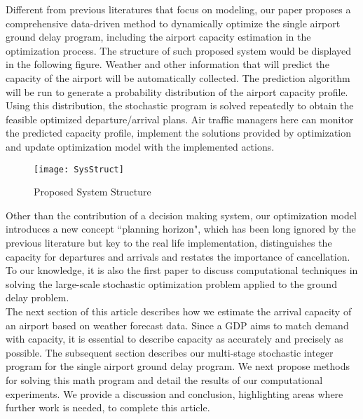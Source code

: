 \documentclass[12pt]{article}
\begin{document}
	\newline
	Different from previous literatures that focus on modeling, our paper proposes a comprehensive data-driven method to dynamically optimize the single airport ground delay program, including the airport capacity estimation in the optimization process. The structure of such proposed system would be displayed in the following figure. Weather and other information that will predict the capacity of the airport will be automatically collected. The prediction algorithm will be run to generate a probability distribution of the airport capacity profile. Using this distribution, the stochastic program is solved repeatedly to obtain the feasible optimized departure/arrival plans. Air traffic managers here can monitor the predicted capacity profile, implement the solutions provided by  optimization and update optimization model with the implemented actions.\\
	\begin{figure}[H]
		\centering
		\texttt{[image: SysStruct]}
		\caption{Proposed System Structure}
		\label{fig:struct}
	\end{figure}
	\noindent Other than the contribution of a decision making system, our optimization model introduces a new concept ``planning horizon", which has been long ignored by the previous literature but key to the real life implementation, distinguishes the capacity for departures and arrivals and restates the importance of cancellation. To our knowledge, it is also the first paper to discuss computational techniques in solving the large-scale stochastic optimization problem applied to the ground delay problem.\\
	\newline
	The next section of this article describes how we estimate the arrival capacity of an airport based on weather forecast data.  Since a GDP aims to match demand with capacity, it is essential to describe capacity as accurately and precisely as possible. The subsequent section describes our multi-stage stochastic integer program for the single airport ground delay program. We next propose methods for solving this math program and detail the results of our computational experiments.  We provide a discussion and conclusion, highlighting areas where further work is needed, to complete this article.
	
\end{document}
